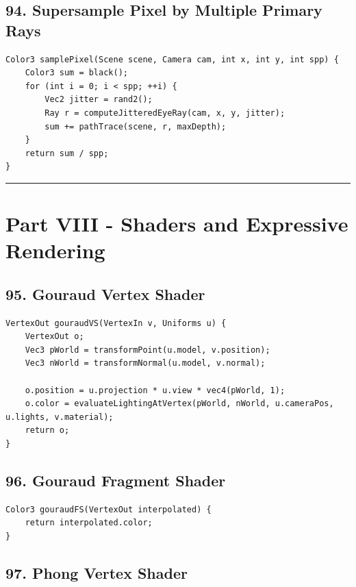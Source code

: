 \documentclass[10pt,letterpaper]{article}
\begin{document}
\subsection{94. Supersample Pixel by Multiple Primary Rays}

\begin{verbatim}
Color3 samplePixel(Scene scene, Camera cam, int x, int y, int spp) {
    Color3 sum = black();
    for (int i = 0; i < spp; ++i) {
        Vec2 jitter = rand2();
        Ray r = computeJitteredEyeRay(cam, x, y, jitter);
        sum += pathTrace(scene, r, maxDepth);
    }
    return sum / spp;
}
\end{verbatim}

\medskip\hrule\medskip

\clearpage
\section{Part VIII - Shaders and Expressive Rendering}

\subsection{95. Gouraud Vertex Shader}

\begin{verbatim}
VertexOut gouraudVS(VertexIn v, Uniforms u) {
    VertexOut o;
    Vec3 pWorld = transformPoint(u.model, v.position);
    Vec3 nWorld = transformNormal(u.model, v.normal);

    o.position = u.projection * u.view * vec4(pWorld, 1);
    o.color = evaluateLightingAtVertex(pWorld, nWorld, u.cameraPos, u.lights, v.material);
    return o;
}
\end{verbatim}

\subsection{96. Gouraud Fragment Shader}

\begin{verbatim}
Color3 gouraudFS(VertexOut interpolated) {
    return interpolated.color;
}
\end{verbatim}

\subsection{97. Phong Vertex Shader}
\end{document}
